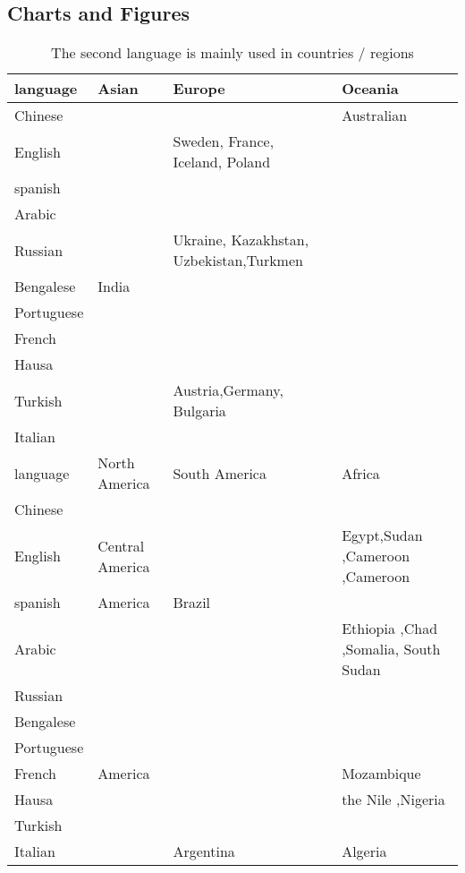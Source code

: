 \begin{appendices}
	\section*{Charts and Figures}
	\begin{table}[H]
		\centering
		\caption{ The second language is mainly used in countries / regions}
		\begin{tabular}{llp{4cm}p{4cm}}
			\toprule
			language & Asian & Europe & Oceania \\
			\midrule
			Chinese &       &       & Australian \\
			\midrule
			English &       & Sweden, France, Iceland, Poland &  \\	\midrule
			spanish &       &       &  \\	\midrule
			Arabic &       &       &  \\	\midrule
			Russian &       &Ukraine, Kazakhstan, Uzbekistan,Turkmen&  \\	\midrule
			Bengalese & India&       &  \\	\midrule
			Portuguese &       &       &  \\	\midrule
			French &       &       &  \\	\midrule
			Hausa &       &       &  \\	\midrule
			Turkish &       & Austria,Germany, Bulgaria &  \\	\midrule
			Italian &       &       &  \\
			\bottomrule
			\toprule
			language & North America& South America &  Africa \\
			\midrule
			Chinese &       &       &  \\	\midrule
			English & Central America & & Egypt,Sudan ,Cameroon ,Cameroon \\	\midrule
			spanish & \multicolumn{1}{l}{America} & Brazil &  \\	\midrule
			Arabic &       &       & Ethiopia ,Chad ,Somalia, South Sudan \\	\midrule
			Russian &       &       &  \\	\midrule
			Bengalese &       &       &  \\	\midrule
			Portuguese &       &       &  \\	\midrule
			French & America&       & Mozambique \\	\midrule
			Hausa &       &       & the Nile ,Nigeria \\	\midrule
			Turkish &       &       &  \\	\midrule
			Italian &       & Argentina & Algeria \\	\midrule
			\bottomrule
		\end{tabular}%
		\label{tab:SixContinents}%
	\end{table}%


\end{appendices}
